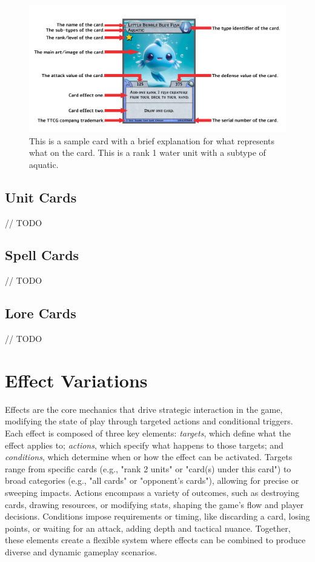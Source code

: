 \begin{figure}[h]
    \centering
    \includegraphics[width=\textwidth]{images/card_details.png} 
    \caption{This is a sample card with a brief explanation for what represents what on the card. This is a rank 1 water unit with a subtype of aquatic.}
    \label{fig:sample_card}
\end{figure}



\subsection{Unit Cards}
// TODO



\subsection{Spell Cards}
// TODO



\subsection{Lore Cards}
// TODO







\section{Effect Variations}
Effects are the core mechanics that drive strategic interaction in the game, modifying the state of play through targeted actions and conditional triggers. Each effect is composed of three key elements: \textit{targets}, which define what the effect applies to; \textit{actions}, which specify what happens to those targets; and \textit{conditions}, which determine when or how the effect can be activated. Targets range from specific cards (e.g., "rank 2 units" or "card(s) under this card") to broad categories (e.g., "all cards" or "opponent’s cards"), allowing for precise or sweeping impacts. Actions encompass a variety of outcomes, such as destroying cards, drawing resources, or modifying stats, shaping the game’s flow and player decisions. Conditions impose requirements or timing, like discarding a card, losing points, or waiting for an attack, adding depth and tactical nuance. Together, these elements create a flexible system where effects can be combined to produce diverse and dynamic gameplay scenarios.

